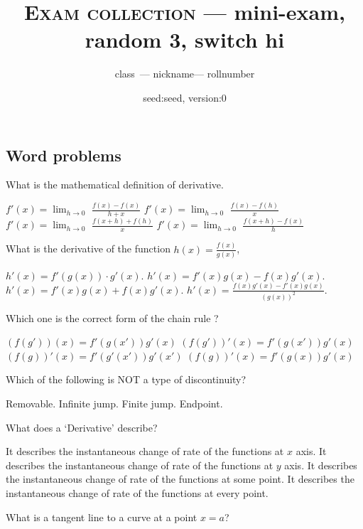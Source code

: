 \documentclass{exam}
\newcommand{\randomnumber}{3}
\newcommand{\switchnumber}{hi}
\newcommand{\class}{class}
\newcommand{\rollnumber}{rollnumber}
\newcommand{\nickname}{nickname}
\newcommand\myversion{0}
\newcommand\rseed{seed}
\begin{document}
\author{\class\ --- \nickname --- \rollnumber}
\title{\textsc{Exam collection} --- mini-exam, random \randomnumber, switch \switchnumber }

\date{seed:\rseed, version:\myversion}
\maketitle


\begin{questions}

\section{Word problems}

	\question What is the mathematical definition of derivative.

	\begin{choices}
		\choice $f'(x) = \lim_{h\to 0}$ $\frac{f(x)-f(x)}{h+x}$
		\choice $f'(x) = \lim_{h\to 0}$ $\frac{f(x)-f(h)}{x}$
		\choice $f'(x) = \lim_{h\to 0}$ $\frac{f(x+h)+f(h)}{x}$
		\CorrectChoice $f'(x) = \lim_{h\to 0}$ $\frac{f(x+h)-f(x)}{h}$
	\end{choices}
	\question What is the derivative of the function $h(x) = \frac{f(x)}{g(x)}$,

	\begin{choices}
		\choice $h'(x) = f'(g(x)) \cdot g'(x).$
		\choice $h'(x) = f'(x)g(x)-f(x)g'(x).$
		\choice $h'(x) = f'(x)g(x)+f(x)g'(x).$
		\CorrectChoice $h'(x) = \frac{f(x)g'(x)-f'(x)g(x)}{(g(x))^2}.$
	\end{choices}

	\question Which one is the correct form of the chain rule ?

	\begin{choices}
		\choice $(f(g'))(x)=f'(g(x'))g'(x)$
		\choice $(f(g'))'(x)=f'(g(x'))g'(x)$
		\choice $(f(g))'(x)=f'(g'(x'))g'(x')$
		\CorrectChoice $(f(g))'(x)=f'(g(x))g'(x)$
	\end{choices}

	\question Which of the following is NOT a type of discontinuity?

	\begin{choices}
		\choice Removable.
		\choice Infinite jump.
		\choice Finite jump.
		\CorrectChoice Endpoint.
	\end{choices}

	\question What does a `Derivative' describe?
	\begin{choices}
		\choice It describes the instantaneous change of rate of the functions at $x$ axis.
		\choice It describes the instantaneous change of rate of the functions at $y$ axis.
		\choice It describes the instantaneous change of rate of the functions at some point.
		\CorrectChoice It describes the instantaneous change of rate of the functions at every point.
	\end{choices}
	\question What is a tangent line to a curve at a point $x = a$?


\end{questions}
\end{document}
